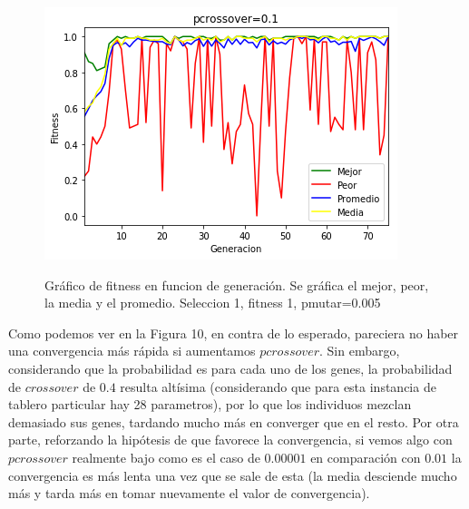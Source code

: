 \documentclass[A4paper,oneside,fleqn,11pt]{article}
\theoremstyle{definition}
\begin{document}
\begin{figure}[H]
	\captionsetup[subfigure]{position=b}
	\centering
		{\includegraphics[width=0.3\linewidth]{crossover1.png}}
	\caption{Gráfico de fitness en funcion de generación. Se gráfica el mejor, peor, la media y el promedio. Seleccion 1, fitness 1, pmutar=0.005}
\end{figure}

Como podemos ver en la Figura 10, en contra de lo esperado, pareciera no haber una convergencia más rápida si aumentamos $pcrossover$. Sin embargo, considerando que la probabilidad es para cada uno de los genes, la probabilidad de $crossover$ de $0.4$ resulta altísima (considerando que para esta instancia de tablero particular hay 28 parametros), por lo que los individuos mezclan demasiado sus genes, tardando mucho más en converger que en el resto. Por otra parte, reforzando la hipótesis de que favorece la convergencia, si vemos algo con $pcrossover$ realmente bajo como es el caso de $0.00001$ en comparación con $0.01$ la convergencia es más lenta una vez que se sale de esta (la media desciende mucho más y tarda más en tomar nuevamente el valor de convergencia).
\end{document}
